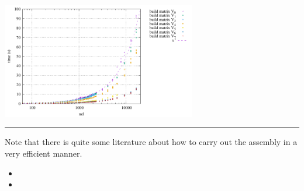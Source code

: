 \begin{center}
\includegraphics[width=8.5cm]{python_codes/fieldstone_150/results/times_build_all}
\end{center}



\par\noindent\rule{\textwidth}{0.4pt}

\vspace{.5cm}

\begin{center}
\end{center}

\vspace{.5cm}

Note that there is quite some literature about how to carry out the assembly in a very efficient 
manner. 
\begin{itemize}
\item {}
\item {}
\end{itemize}


